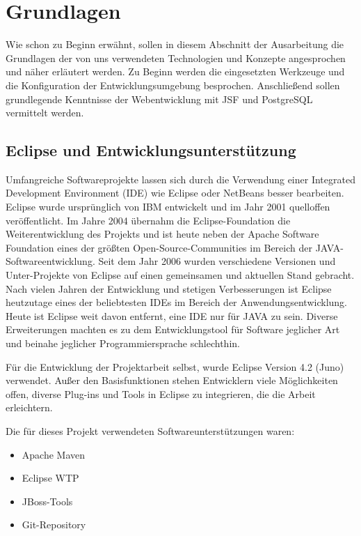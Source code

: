 \section{Grundlagen}\label{sec:Grundlagen}

Wie schon zu Beginn erwähnt, sollen in diesem Abschnitt der Ausarbeitung die Grundlagen der von uns verwendeten Technologien und Konzepte angesprochen und näher erläutert werden. Zu Beginn werden die eingesetzten Werkzeuge und die Konfiguration der Entwicklungsumgebung besprochen. Anschließend sollen grundlegende Kenntnisse der Webentwicklung mit \ac{JSF} und PostgreSQL vermittelt werden.

\subsection{Eclipse und Entwicklungsunterstützung}
Umfangreiche Softwareprojekte lassen sich durch die Verwendung einer \gls{Integrated Development Environment} (IDE) wie \gls{Eclipse} oder \gls{NetBeans} besser bearbeiten. 
Eclipse wurde ursprünglich von IBM entwickelt und im Jahr 2001 quelloffen veröffentlicht. Im Jahre 2004 übernahm die \gls{Eclipse-Foundation} die Weiterentwicklung des Projekts und ist heute neben der \gls{Apache Software Foundation} eines der größten Open-Source-Communities im Bereich der JAVA-Softwareentwicklung.
Seit dem Jahr 2006 wurden verschiedene Versionen und Unter-Projekte von Eclipse auf einen gemeinsamen und aktuellen Stand gebracht.
Nach vielen Jahren der Entwicklung und stetigen Verbesserungen ist Eclipse heutzutage eines der beliebtesten IDEs im Bereich der Anwendungsentwicklung.
Heute ist Eclipse weit davon entfernt, eine IDE nur für JAVA zu sein. Diverse Erweiterungen machten es zu dem Entwicklungstool für Software jeglicher Art und beinahe jeglicher Programmiersprache schlechthin.

Für die Entwicklung der Projektarbeit selbst, wurde Eclipse Version 4.2 (Juno) verwendet.
Außer den Basisfunktionen stehen Entwicklern viele Möglichkeiten offen, diverse Plug-ins und Tools in Eclipse zu integrieren, die die Arbeit erleichtern.

Die für dieses Projekt verwendeten Softwareunterstützungen waren:
\begin{itemize}
	\item \gls{Apache Maven}
	\item Eclipse \ac{WTP}
	\item JBoss-Tools
	\item Git-Repository
\end{itemize}
  
